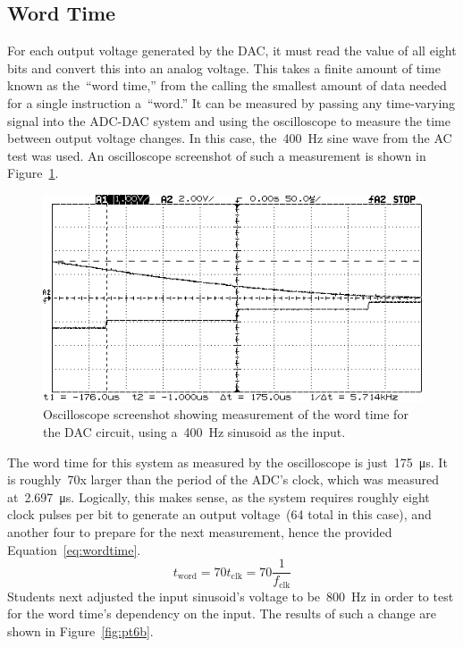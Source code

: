 \subsection{Word Time}
For each output voltage generated by the DAC, it must read the value of all eight bits and convert this into an analog voltage.  This takes a finite amount of time known as the~``word time,'' from the calling the smallest amount of data needed for a single instruction a~``word.''  It can be measured by passing any time-varying signal into the ADC-DAC system and using the oscilloscope to measure the time between output voltage changes.  In this case, the~\SI{400}{\hertz} sine wave from the AC test was used.  An oscilloscope screenshot of such a measurement is shown in Figure~\ref{fig:pt6a}.
%
\begin{figure}[H]
	\centering
	\includegraphics[width=.6\textwidth]{img/shot/pt6a_wordtime.png}
	\parbox{.6\textwidth}{
	\caption[Word Time Measurement --- \SI{400}{\hertz} Sinusoid]{Oscilloscope screenshot showing measurement of the word time for the DAC circuit, using a~\SI{400}{\hertz} sinusoid as the input.}
	\label{fig:pt6a}}
\end{figure}
%
The word time for this system as measured by the oscilloscope is just~\SI{175}{\micro\second}.  It is roughly~70x larger than the period of the ADC's clock, which was measured at~\SI{2.697}{\micro\second}.  Logically, this makes sense, as the system requires roughly eight clock pulses per bit to generate an output voltage~(64 total in this case), and another four to prepare for the next measurement, hence the provided Equation~\eqref{eq:wordtime}.
%
\begin{equation}
	t_\text{word} = 70 t_\text{clk} = 70 \frac{1}{f_\text{clk}} \label{eq:wordtime}
\end{equation}
%
Students next adjusted the input sinusoid's voltage to be~\SI{800}{\hertz} in order to test for the word time's dependency on the input.  The results of such a change are shown in Figure~\ref{fig:pt6b}.
%
